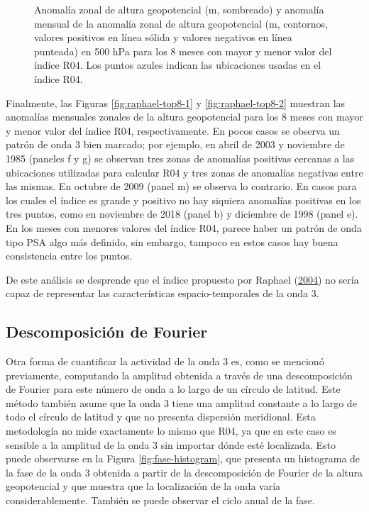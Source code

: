 \documentclass[12pt,oneside,a4paper]{reedthesis}
\begin{document}
\begin{figure}
{}

\caption{Anomalía zonal de altura geopotencial (m, sombreado) y anomalía mensual de la anomalía zonal de altura geopotencial (m, contornos, valores positivos en línea sólida y valores negativos en línea punteada) en 500 hPa para los 8 meses con mayor y menor valor del índice R04. Los puntos azules indican las ubicaciones usadas en el índice R04.}\label{fig:raphael-top8}
\end{figure}



Finalmente, las Figuras \ref{fig:raphael-top8-1} y \ref{fig:raphael-top8-2} muestran las anomalías mensuales zonales de la altura geopotencial para los 8 meses con mayor y menor valor del índice R04, respectivamente.
En pocos casos se observa un patrón de onda 3 bien marcado; por ejemplo, en abril de 2003 y noviembre de 1985 (paneles f y g) se observan tres zonas de anomalías positivas cercanas a las ubicaciones utilizadas para calcular R04 y tres zonas de anomalías negativas entre las mismas.
En octubre de 2009 (panel m) se observa lo contrario.
En casos para los cuales el índice es grande y positivo no hay siquiera anomalías positivas en los tres puntos, como en noviembre de 2018 (panel b) y diciembre de 1998 (panel e).
En los meses con menores valores del índice R04, parece haber un patrón de onda tipo PSA algo más definido, sin embargo, tampoco en estos casos hay buena consistencia entre los puntos.

De este análisis se desprende que el índice propuesto por Raphael (\protect\hyperlink{ref-raphael2004}{2004}) no sería capaz de representar las características espacio-temporales de la onda 3.

\hypertarget{descomposiciuxf3n-de-fourier}{%
\subsection{Descomposición de Fourier}\label{descomposiciuxf3n-de-fourier}}

Otra forma de cuantificar la actividad de la onda 3 es, como se mencionó previamente, computando la amplitud obtenida a través de una descomposición de Fourier para este número de onda a lo largo de un círculo de latitud.
Este método también asume que la onda 3 tiene una amplitud constante a lo largo de todo el círculo de latitud y que no presenta dispersión meridional.
Esta metodología no mide exactamente lo mismo que R04, ya que en este caso es sensible a la amplitud de la onda 3 sin importar dónde esté localizada.
Esto puede observarse en la Figura \ref{fig:fase-histogram}, que presenta un histograma de la fase de la onda 3 obtenida a partir de la descomposición de Fourier de la altura geopotencial y que muestra que la localización de la onda varía considerablemente.
También se puede observar el ciclo anual de la fase.
\end{document}
